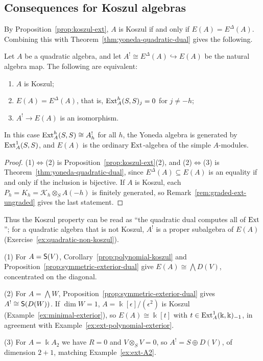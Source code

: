 \subsection{Consequences for Koszul algebras}

By Proposition~\ref{prop:koszul-ext}, $A$ is Koszul if and only if $E(A)=E^\Delta(A)$.
Combining this with Theorem~\ref{thm:yoneda-quadratic-dual} gives the following.

\begin{corollary}\label{cor:yoneda-koszul}
Let $A$ be a quadratic algebra, and let $A^!\cong E^\Delta(A)\hookrightarrow E(A)$ be the natural algebra map.
The following are equivalent:
\begin{enumerate}
\item $A$ is Koszul;
\item $E(A)=E^\Delta(A)$, that is, $\operatorname{Ext}\nolimits_A^h(S,S)_j=0$ for $j\neq-h$;
\item $A^!\to E(A)$ is an isomorphism.
\end{enumerate}
In this case $\operatorname{Ext}\nolimits_A^h(S,S)\cong A^!_h$ for all $h$, the Yoneda algebra is generated by $\operatorname{Ext}\nolimits_A^1(S,S)$, and $E(A)$ is the ordinary $\operatorname{Ext}\nolimits$-algebra of the simple $A$-modules.
\end{corollary}

\begin{proof}
(1)$\Leftrightarrow$(2) is Proposition~\ref{prop:koszul-ext}(2), and (2)$\Leftrightarrow$(3) is Theorem~\ref{thm:yoneda-quadratic-dual}, since $E^\Delta(A)\subseteq E(A)$ is an equality if and only if the inclusion is bijective.
If $A$ is Koszul, each $P_h=K_h=\mathcal K_h\otimes_SA(-h)$ is finitely generated, so Remark~\ref{rem:graded-ext-ungraded} gives the last statement.
\end{proof}

Thus the Koszul property can be read as ``the quadratic dual computes all of $\operatorname{Ext}\nolimits$''; for a quadratic algebra that is not Koszul, $A^!$ is a proper subalgebra of $E(A)$ (Exercise~\ref{ex:quadratic-non-koszul}).

\begin{example}\label{ex:yoneda-examples}
(1) For $A=\mathsf{S}(V)$, Corollary~\ref{prop:polynomial-koszul} and Proposition~\ref{prop:symmetric-exterior-dual} give $E(A)\cong\bigwedge D(V)$, concentrated on the diagonal.

(2) For $A=\bigwedge W$, Proposition~\ref{prop:symmetric-exterior-dual} gives $A^!\cong\mathsf{S}(D(W))$.
If $\dim W=1$, $A=\Bbbk[\epsilon]/(\epsilon^2)$ is Koszul (Example~\ref{ex:minimal-exterior}), so $E(A)\cong\Bbbk[t]$ with $t\in\operatorname{Ext}\nolimits^1_A(\Bbbk,\Bbbk)_{-1}$, in agreement with Example~\ref{ex:ext-polynomial-exterior}.

(3) For $A=\Bbbk A_2$ we have $R=0$ and $V\otimes_SV=0$, so $A^!=S\oplus D(V)$, of dimension $2+1$, matching Example~\ref{ex:ext-A2}.
\end{example}

